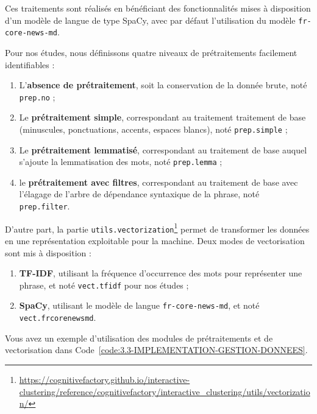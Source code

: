 		Ces traitements sont réalisés en bénéficiant des fonctionnalités mises à disposition d'un modèle de langue de type SpaCy, avec par défaut l'utilisation du modèle \texttt{fr-core-news-md}.
		
		Pour nos études, nous définissons quatre niveaux de prétraitements facilement identifiables :
		\begin{enumerate}
			\item L'\textbf{absence de prétraitement}, soit la conservation de la donnée brute, noté \texttt{prep.no} ;
			\item Le \textbf{prétraitement simple}, correspondant au traitement traitement de base (minuscules, ponctuations, accents, espaces blancs), noté \texttt{prep.simple} ; 
			\item Le \textbf{prétraitement lemmatisé}, correspondant au traitement de base auquel s'ajoute la lemmatisation des mots, noté \texttt{prep.lemma} ;
			\item le \textbf{prétraitement avec filtres}, correspondant au traitement de base avec l'élagage de l'arbre de dépendance syntaxique de la phrase, noté \texttt{prep.filter}.
		\end{enumerate}
		
		
		D'autre part, la partie \texttt{utils.vectorization}\footnote{\url{https://cognitivefactory.github.io/interactive-clustering/reference/cognitivefactory/interactive_clustering/utils/vectorization/}} permet de transformer les données en une représentation exploitable pour la machine.
		Deux modes de vectorisation sont mis à disposition :
		
		\begin{enumerate}
			\item \textbf{TF-IDF}, utilisant la fréquence d'occurrence des mots pour représenter une phrase, et noté \texttt{vect.tfidf} pour nos études ;
			\item \textbf{SpaCy}, utilisant le modèle de langue \texttt{fr-core-news-md}, et noté \texttt{vect.frcorenewsmd}.
		\end{enumerate}
		
		Vous avez un exemple d'utilisation des modules de prétraitements et de vectorisation dans Code~\ref{code:3.3-IMPLEMENTATION-GESTION-DONNEES}.
		
